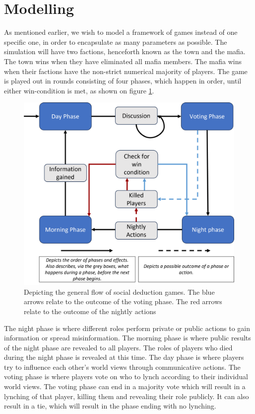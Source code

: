 \section{Modelling}
As mentioned earlier, we wish to model a framework of games instead of one
specific one, in order to encapsulate as many parameters as possible. The
simulation will have two factions, henceforth known as the town and the mafia.
The town wins when they have eliminated all mafia members. The mafia wins when
their factions have the non-strict numerical majority of players. The game is
played out in rounds consisting of four phases, which happen in order, until
either win-condition is met, as shown on figure \ref{fig:GameOverview}.
\begin{figure}[H]
	\includegraphics[width=1\linewidth]{figures/Game_overview}
	\caption{Depicting the general flow of social deduction games. The blue arrows relate to the outcome of the voting phase. The red arrows relate to the outcome of the nightly actions}
	\label{fig:GameOverview}
\end{figure}

The night phase is where different roles perform private or public actions to
gain information or spread misinformation. The morning phase is where public
results of the night phase are revealed to all players. The roles of players
who died during the night phase is revealed at this time. The day phase is
where players try to influence each other's world views through communicative
actions. The voting phase is where players vote on who to lynch according to
their individual world views. The voting phase can end in a majority vote which
will result in a lynching of that player, killing them and revealing their role
publicly. It can also result in a tie, which will result in the phase ending
with no lynching.

